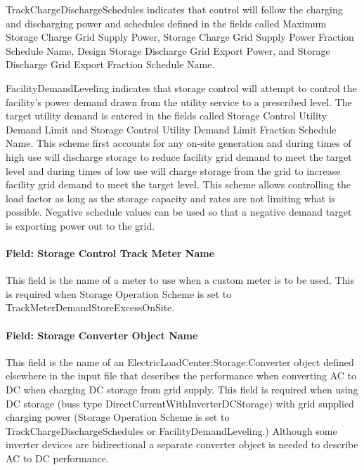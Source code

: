 TrackChargeDischargeSchedules indicates that control will follow the charging and discharging power and schedules defined in the fields called Maximum Storage Charge Grid Supply Power, Storage Charge Grid Supply Power Fraction Schedule Name, Design Storage Discharge Grid Export Power, and Storage Discharge Grid Export Fraction Schedule Name.

FacilityDemandLeveling indicates that storage control will attempt to control the facility's power demand drawn from the utility service to a prescribed level. The target utility demand is entered in the fields called Storage Control Utility Demand Limit and Storage Control Utility Demand Limit Fraction Schedule Name. This scheme first accounts for any on-site generation and during times of high use will discharge storage to reduce facility grid demand to meet the target level and during times of low use will charge storage from the grid to increase facility grid demand to meet the target level. This scheme allows controlling the load factor as long as the storage capacity and rates are not limiting what is possible. Negative schedule values can be used so that a negative demand target is exporting power out to the grid.

\paragraph{Field: Storage Control Track Meter Name}\label{field-storage-control-track-meter-name}

This field is the name of a meter to use when a custom meter is to be used. This is required when Storage Operation Scheme is set to TrackMeterDemandStoreExcessOnSite.

\paragraph{Field: Storage Converter Object Name}\label{field-storage-converter-object-name}

This field is the name of an ElectricLoadCenter:Storage:Converter object defined elsewhere in the input file that describes the performance when converting AC to DC when charging DC storage from grid supply. This field is required when using DC storage (buss type DirectCurrentWithInverterDCStorage) with grid supplied charging power (Storage Operation Scheme is set to TrackChargeDischargeSchedules or FacilityDemandLeveling.) Although some inverter devices are bidirectional a separate converter object is needed to describe AC to DC performance.

